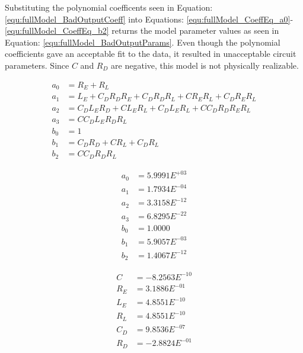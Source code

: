 

Substituting the polynomial coefficents seen in Equation: \eqref{equ:fullModel_BadOutputCoeff} into Equations: \eqref{equ:fullModel_CoeffEq_a0}-\eqref{equ:fullModel_CoeffEq_b2} returns the model parameter values as seen in Equation: \eqref{equ:fullModel_BadOutputParams}.
Even though the polynomial coefficients gave an acceptable fit to the data, it resulted in unacceptable circuit parameters. Since $C$ and $R_D$ are negative, this model is not physically realizable.

\begin{align}
     a_0 &= R_E + R_L                                         \label{equ:fullModel_CoeffEq_a0} \\
     a_1 &= L_E + C_DR_DR_E + C_DR_DR_L + CR_ER_L + C_DR_ER_L \label{equ:fullModel_CoeffEq_a1} \\
     a_2 &= C_DL_ER_D + CL_ER_L + C_DL_ER_L + CC_DR_DR_ER_L   \label{equ:fullModel_CoeffEq_a2} \\
     a_3 &= CC_DL_ER_DR_L                                     \label{equ:fullModel_CoeffEq_a3} \\
     b_0 &= 1                                                 \label{equ:fullModel_CoeffEq_b0} \\
     b_1 &= C_DR_D + CR_L + C_DR_L                            \label{equ:fullModel_CoeffEq_b1} \\
     b_2 &= CC_DR_DR_L                                        \label{equ:fullModel_CoeffEq_b2}
\end{align}

\begin{multicols}{2}
    \begin{equation}
        \label{equ:fullModel_BadOutputCoeff}
        \begin{split}
             a_0 &= 5.9991E^{+03} \\
             a_1 &= 1.7934E^{-04} \\
             a_2 &= 3.3158E^{-12} \\
             a_3 &= 6.8295E^{-22} \\
             b_0 &= 1.0000        \\
             b_1 &= 5.9057E^{-03} \\
             b_2 &= 1.4067E^{-12}
        \end{split}
    \end{equation}

    \begin{equation}
        \label{equ:fullModel_BadOutputParams}
        \begin{split}
            C &= -8.2563E^{-10} \\
            R_E &=  3.1886E^{-01} \\
            L_E &=  4.8551E^{-10} \\
            R_L &=  4.8551E^{-10} \\
            C_D &=  9.8536E^{-07} \\
            R_D &= -2.8824E^{-01}
        \end{split}
    \end{equation}
\end{multicols}

